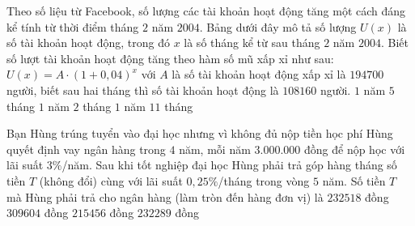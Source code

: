 \begin{ex}%
	Theo số liệu từ Facebook, số lượng các tài khoản hoạt động tăng một cách đáng kể tính từ thời điểm tháng $2$ năm $2004$. Bảng dưới đây mô tả số lượng $U(x)$ là số tài khoản hoạt động, trong đó $x$ là số tháng kể từ sau tháng $2$ năm $2004$. Biết số lượt tài khoản hoạt động tăng theo hàm số mũ xấp xỉ như sau: $U(x)=A\cdot(1+0{,}04)^x$ với $A$ là số tài khoản hoạt động xấp xỉ là $194700$ người, biết sau hai tháng thì số tài khoản hoạt động là $108160$ người. 
	\choice
	{\True $1$ năm $5$ tháng}
	{$1$ năm $2$ tháng}
	{$1$ năm}
	{$11$ tháng}
\end{ex}
\begin{ex}%
	Bạn Hùng trúng tuyển vào đại học nhưng vì không đủ nộp tiền học phí Hùng quyết định vay ngân hàng trong $4$ năm, mỗi năm $3.000.000$ đồng để nộp học với lãi suất $3\%$/năm. Sau khi tốt nghiệp đại học Hùng phải trả góp hàng tháng số tiền $T$ (không đổi) cùng với lãi suất $0{,}25\%$/tháng trong vòng $5$ năm. Số tiền $T$ mà Hùng phải trả cho ngân hàng (làm tròn đến hàng đơn vị) là
	\choice
	{$232518$ đồng}
	{$309604$ đồng}
	{$215456$ đồng}
	{\True $232289$ đồng}
\end{ex}




